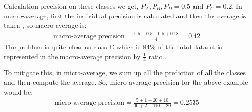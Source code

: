 Calculation precision on these classes we get, $P_{A}, P_{B}, P_{D}= 0.5$ and $P_{C} = 0.2$. 
In macro-average, first the individual precision is calculated and then the average is taken \cite{manning2009introduction}, so macro-average is:
\begin{align}
    \text{macro-average precision} = \frac{0.5+0.5+0.5+0.18}{4} = 0.42
\end{align}
The problem is quite clear as class C which is 84\% of the total dataset is represented in the macro-average precision by $\frac{1}{4}$ ratio \cite{manning2009introduction}.

To mitigate this, in micro-average, we sum up all the prediction of all the classes and then compute the average.
So, micro-average precision for the above example would be:
\begin{align}
    \text{micro-average precision} = \frac{5+1+20+10}{10+2+110+20} = 0.2535
\end{align}


